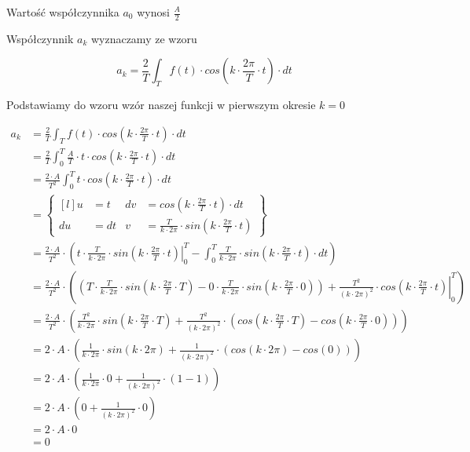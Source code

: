 \begin{task}
Wartość współczynnika $a_0$ wynosi $\frac{A}{2}$

Współczynnik $a_k$ wyznaczamy ze wzoru

\begin{equation}
a_k=\frac{2}{T}\int_{T}f(t) \cdot cos\left( k \cdot \frac{2\pi}{T} \cdot t\right) \cdot dt
\end{equation}

Podstawiamy do wzoru wzór naszej funkcji w pierwszym okresie $k=0$

\begin{equation}
\begin{aligned}
a_k&=\frac{2}{T}\int_{T}f(t) \cdot cos\left( k \cdot \frac{2\pi}{T} \cdot t\right) \cdot dt\\
&=\frac{2}{T}\int_{0}^{T} \frac{A}{T} \cdot t \cdot cos\left( k \cdot \frac{2\pi}{T} \cdot t\right) \cdot dt\\
&=\frac{2\cdot A}{T^2}\int_{0}^{T} t \cdot cos\left( k \cdot \frac{2\pi}{T} \cdot t\right) \cdot dt\\
&=\begin{Bmatrix*}[l]
u&=t & dv&=cos\left( k \cdot \frac{2\pi}{T} \cdot t\right) \cdot dt \\
du&=dt & v&=\frac{T}{k\cdot 2\pi}\cdot sin\left( k \cdot \frac{2\pi}{T} \cdot t\right)
\end{Bmatrix*}\\
&=\frac{2\cdot A}{T^2}\cdot \left( \left. t \cdot \frac{T}{k\cdot 2\pi}\cdot sin\left( k \cdot \frac{2\pi}{T} \cdot t\right) \right|_{0}^{T} - \int_{0}^{T}  \frac{T}{k\cdot 2\pi}\cdot sin\left( k \cdot \frac{2\pi}{T} \cdot t\right) \cdot dt \right)\\
&=\frac{2\cdot A}{T^2}\cdot \left( \left( T \cdot \frac{T}{k\cdot 2\pi}\cdot sin\left( k \cdot \frac{2\pi}{T} \cdot T\right) - 0 \cdot \frac{T}{k\cdot 2\pi}\cdot sin\left( k \cdot \frac{2\pi}{T} \cdot 0\right) \right) + \left.  \frac{T^2}{\left(k\cdot 2\pi\right)^2}\cdot cos\left( k \cdot \frac{2\pi}{T} \cdot t\right) \right|_{0}^{T} \right)\\
&=\frac{2\cdot A}{T^2}\cdot \left(\frac{T^2}{k\cdot 2\pi}\cdot sin\left( k \cdot \frac{2\pi}{T} \cdot T\right) + \frac{T^2}{\left(k\cdot 2\pi\right)^2}\cdot \left( cos\left( k \cdot \frac{2\pi}{T} \cdot T\right) - cos\left( k \cdot \frac{2\pi}{T} \cdot 0\right) \right) \right)\\
&=2\cdot A\cdot \left(\frac{1}{k\cdot 2\pi}\cdot sin\left( k \cdot 2\pi\right) + \frac{1}{\left(k\cdot 2\pi\right)^2}\cdot \left( cos\left( k \cdot 2\pi\right) - cos\left( 0\right) \right) \right)\\
&=2\cdot A\cdot \left(\frac{1}{k\cdot 2\pi}\cdot 0 + \frac{1}{\left(k\cdot 2\pi\right)^2}\cdot \left( 1 - 1 \right) \right)\\
&=2\cdot A\cdot \left(0 + \frac{1}{\left(k\cdot 2\pi\right)^2}\cdot 0 \right)\\
&=2\cdot A\cdot 0\\
&=0
\end{aligned}
\end{equation}


\end{task}
